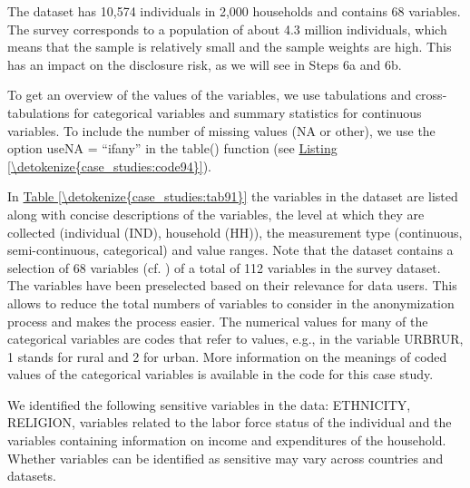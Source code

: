 \documentclass[letterpaper,10pt,english]{sphinxmanual}
\begin{document}
\begin{sphinxVerbatim}[commandchars=\\\{\},numbers=left,firstnumber=1,stepnumber=1]
\end{sphinxVerbatim}

The dataset has 10,574 individuals in 2,000 households and contains 68
variables. The survey corresponds to a population of about 4.3 million
individuals, which means that the sample is relatively small and the
sample weights are high. This has an impact on the disclosure risk, as
we will see in Steps 6a and 6b.

To get an overview of the values of the variables, we use tabulations
and cross-tabulations for categorical variables and summary statistics
for continuous variables. To include the number of missing values (NA or
other), we use the option useNA = “ifany” in the table() function (see \hyperref[\detokenize{case_studies:code94}]{Listing \ref{\detokenize{case_studies:code94}}}).

In \hyperref[\detokenize{case_studies:tab91}]{Table \ref{\detokenize{case_studies:tab91}}} the variables in the dataset are listed along with concise
descriptions of the variables, the level at which they are collected
(individual (IND), household (HH)), the measurement type (continuous,
semi-continuous, categorical) and value ranges. Note that the dataset
contains a selection of 68 variables (cf. ) of a total of 112
variables in the survey dataset. The variables have been preselected
based on their relevance for data users. This allows to reduce the total
numbers of variables to consider in the anonymization process and makes
the process easier. The numerical values for many of the categorical
variables are codes that refer to values, e.g., in the variable URBRUR,
1 stands for rural and 2 for urban. More information on the meanings of
coded values of the categorical variables is available in the  code
for this case study.

We identified the following sensitive variables in the data: ETHNICITY,
RELIGION, variables related to the labor force status of the individual
and the variables containing information on income and expenditures of
the household. Whether variables can be identified as sensitive may vary
across countries and datasets.
\end{document}

